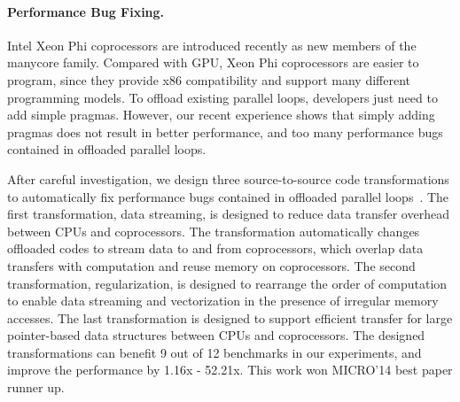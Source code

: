 \documentclass[10pt]{article}
\begin{document}
\vspace{-.1in}
\paragraph{Performance Bug Fixing.}
Intel Xeon Phi coprocessors are introduced recently as new members of the manycore family. 
Compared with GPU, Xeon Phi coprocessors are easier to program,
since they provide x86 compatibility and support many different programming models.
To offload existing parallel loops, developers just need to add simple pragmas. 
However, our recent experience shows that simply adding pragmas does not result in better performance, 
and too many performance bugs contained in offloaded parallel loops. 


After careful investigation, we design three source-to-source code transformations to 
automatically fix performance bugs contained in offloaded parallel loops~\cite{Song14MICRO}. 
The first transformation, data streaming, is designed to reduce data transfer overhead between CPUs and coprocessors. 
The transformation automatically changes offloaded codes to stream data to and from coprocessors, 
which overlap data transfers with computation and reuse memory on coprocessors.
The second transformation, regularization, is designed to rearrange the order of computation to 
enable data streaming and vectorization in the presence of irregular memory accesses. 
The last transformation is designed to support efficient transfer for large pointer-based data structures between CPUs and coprocessors. 
The designed transformations can benefit 9 out of 12 benchmarks in our experiments, and improve the performance by 1.16x - 52.21x. 
This work won MICRO'14 best paper runner up.  
\end{document}
